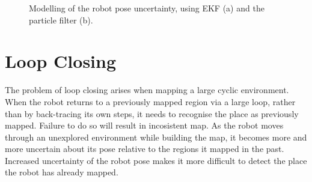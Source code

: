 \begin{figure}
\begin{center}
\quad
{}
\end{center}

\caption[Comparison of uncertainty representation.]
{Modelling of the robot pose uncertainty,
 using EKF (a) and the particle filter (b).
}
\label{fig:post_ekf_vs_pf}
\end{figure}




\section{Loop Closing}
\label{sec:back_loop}

The problem of loop closing arises when mapping a large cyclic
environment. When the robot returns to a previously mapped region via
a large loop, rather than by back-tracing its own steps, it needs to
recognise the place as previously mapped. Failure to do so will result
in incosistent map.  As the robot moves through an unexplored
environment while building the map, it becomes more and more uncertain
about its pose relative to the regions it mapped in the past.
Increased uncertainty of the robot pose makes it more difficult to
detect the place the robot has already mapped.

